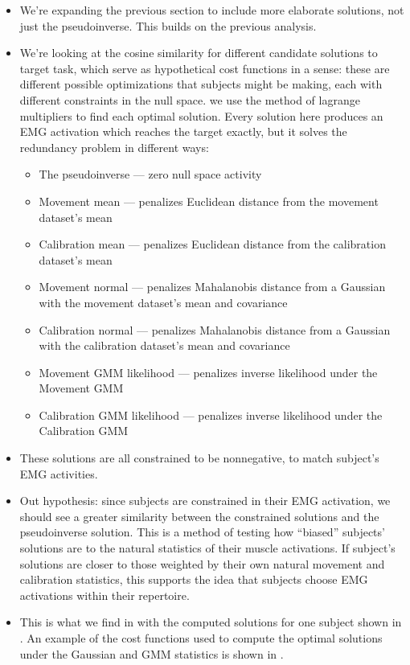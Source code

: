 \documentclass[../main.tex]{subfiles}
\begin{document}
\begin{itemize}
  \setlength\itemsep{0em}
  \item We're expanding the previous section to include more elaborate solutions, not just the pseudoinverse. This builds on the previous analysis.
  \item We're looking at the cosine similarity for different candidate solutions to target task, which serve as hypothetical cost functions in a sense: these are different possible optimizations that subjects might be making, each with different constraints in the null space. we use the method of lagrange multipliers to find each optimal solution. Every solution here produces an EMG activation which reaches the target exactly, but it solves the redundancy problem in different ways:
  \begin{itemize}
    \item The pseudoinverse --- zero null space activity
    \item Movement mean --- penalizes Euclidean distance from the movement dataset's mean
    \item Calibration mean --- penalizes Euclidean distance from the calibration dataset's mean
    \item Movement normal --- penalizes Mahalanobis distance from a Gaussian with the movement dataset's mean and covariance
    \item Calibration normal --- penalizes Mahalanobis distance from a Gaussian with the calibration dataset's mean and covariance
    \item Movement GMM likelihood --- penalizes inverse likelihood under the Movement GMM
    \item Calibration GMM likelihood --- penalizes inverse likelihood under the Calibration GMM
  \end{itemize}
  \item These solutions are all constrained to be nonnegative, to match subject's EMG activities.
  \item Out hypothesis: since subjects are constrained in their EMG activation, we should see a greater similarity between the constrained solutions and the pseudoinverse solution. This is a method of testing how ``biased'' subjects' solutions are to the natural statistics of their muscle activations. If subject's solutions are closer to those weighted by their own natural movement and calibration statistics, this supports the idea that subjects choose EMG activations within their repertoire. 
  \item This is what we find in  with the computed solutions for one subject shown in . An example of the cost functions used to compute the optimal solutions under the Gaussian and GMM statistics is shown in .

\end{itemize}
\end{document}
